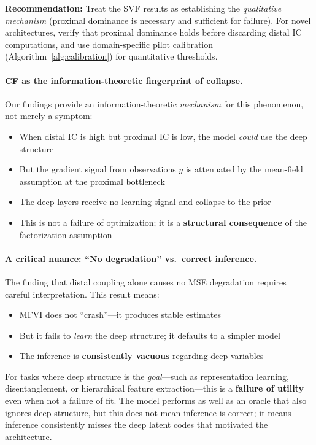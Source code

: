 \documentclass[10pt]{article} %
\theoremstyle{plain}
\theoremstyle{definition}
\begin{document}
\begin{tcolorbox}[breakable, colback=gray!5, colframe=black!75, title=\textbf{Empirical Scope and Topological Generality}, fonttitle=\bfseries]
\textbf{Recommendation:} Treat the SVF results as establishing the \emph{qualitative mechanism} (proximal dominance is necessary and sufficient for failure). For novel architectures, verify that proximal dominance holds before discarding distal IC computations, and use domain-specific pilot calibration (Algorithm~\ref{alg:calibration}) for quantitative thresholds.
\end{tcolorbox}

\paragraph{CF as the information-theoretic fingerprint of collapse.} Our findings provide an information-theoretic \emph{mechanism} for this phenomenon, not merely a symptom:
\begin{itemize}
    \item When distal IC is high but proximal IC is low, the model \emph{could} use the deep structure
    \item But the gradient signal from observations $y$ is attenuated by the mean-field assumption at the proximal bottleneck
    \item The deep layers receive no learning signal and collapse to the prior
    \item This is not a failure of optimization; it is a \textbf{structural consequence} of the factorization assumption
\end{itemize}

\paragraph{A critical nuance: ``No degradation'' vs.\ correct inference.} The finding that distal coupling alone causes no MSE degradation requires careful interpretation. This result means:
\begin{itemize}
    \item MFVI does not ``crash''---it produces stable estimates
    \item But it fails to \emph{learn} the deep structure; it defaults to a simpler model
    \item The inference is \textbf{consistently vacuous} regarding deep variables
\end{itemize}

\noindent For tasks where deep structure is the \emph{goal}---such as representation learning, disentanglement, or hierarchical feature extraction---this is a \textbf{failure of utility} even when not a failure of fit. The model performs as well as an oracle that also ignores deep structure, but this does not mean inference is correct; it means inference consistently misses the deep latent codes that motivated the architecture.
\end{document}
